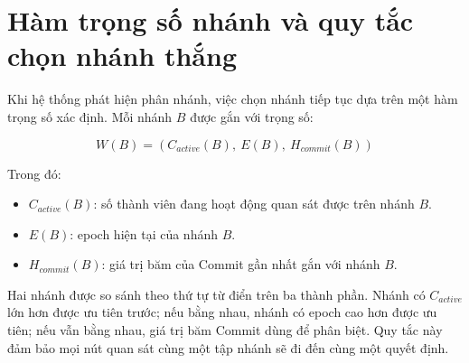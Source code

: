 \documentclass[../DoAn.tex]{subfiles}
\begin{document}
\section{Hàm trọng số nhánh và quy tắc chọn nhánh thắng}

Khi hệ thống phát hiện phân nhánh, việc chọn nhánh tiếp tục dựa trên một hàm trọng số xác định. Mỗi nhánh $B$ được gắn với trọng số:

\begin{equation}
\label{eq:branch_weight_appendix}
W(B) = \left(C_{active}(B),\ E(B),\ H_{commit}(B)\right)
\end{equation}

Trong đó:

\begin{itemize}
    \item $C_{active}(B)$: số thành viên đang hoạt động quan sát được trên nhánh $B$.
    \item $E(B)$: epoch hiện tại của nhánh $B$.
    \item $H_{commit}(B)$: giá trị băm của Commit gần nhất gắn với nhánh $B$.
\end{itemize}

Hai nhánh được so sánh theo thứ tự từ điển trên ba thành phần. Nhánh có $C_{active}$ lớn hơn được ưu tiên trước; nếu bằng nhau, nhánh có epoch cao hơn được ưu tiên; nếu vẫn bằng nhau, giá trị băm Commit dùng để phân biệt. Quy tắc này đảm bảo mọi nút quan sát cùng một tập nhánh sẽ đi đến cùng một quyết định.
\end{document}
